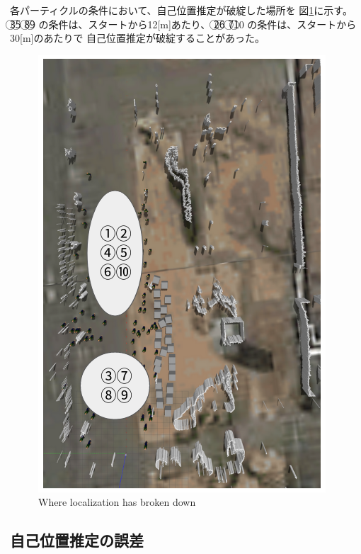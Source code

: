 \documentclass{jarticle}
\begin{document}
各パーティクルの条件において、自己位置推定が破綻した場所を
図\ref{fig:失敗箇所}に示す。
\textcircled{\scriptsize 3}\textcircled{\scriptsize 5}\noindent
\textcircled{\scriptsize 8}\textcircled{\scriptsize 9}\noindent
の条件は、スタートから12[m]あたり、
\textcircled{\scriptsize 2}\textcircled{\scriptsize 6}\noindent
\textcircled{\scriptsize 7}\textcircled{\scriptsize 10}\noindent
の条件は、スタートから30[m]のあたりで
自己位置推定が破綻することがあった。

\begin{figure}[htbp]
  \centering
   \includegraphics[width=0.8\linewidth]{fig/failure_location.png}
   \vspace*{-4mm}
   \caption{Where localization has broken down}
   \label{fig:失敗箇所}
\end{figure}

\subsection{自己位置推定の誤差}
\end{document}
